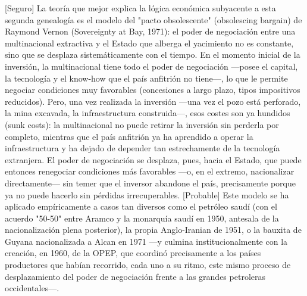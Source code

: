 \documentclass[10pt,a4paper]{article}
\begin{document}
[Seguro] La teoría que mejor explica la lógica económica subyacente a esta segunda genealogía es el modelo del "pacto obsolescente" (obsolescing bargain) de Raymond Vernon (Sovereignty at Bay, 1971): el poder de negociación entre una multinacional extractiva y el Estado que alberga el yacimiento no es constante, sino que se desplaza sistemáticamente con el tiempo. En el momento inicial de la inversión, la multinacional tiene todo el poder de negociación —posee el capital, la tecnología y el know-how que el país anfitrión no tiene—, lo que le permite negociar condiciones muy favorables (concesiones a largo plazo, tipos impositivos reducidos). Pero, una vez realizada la inversión —una vez el pozo está perforado, la mina excavada, la infraestructura construida—, esos costes son ya hundidos (sunk costs): la multinacional no puede retirar la inversión sin perderla por completo, mientras que el país anfitrión ya ha aprendido a operar la infraestructura y ha dejado de depender tan estrechamente de la tecnología extranjera. El poder de negociación se desplaza, pues, hacia el Estado, que puede entonces renegociar condiciones más favorables —o, en el extremo, nacionalizar directamente— sin temer que el inversor abandone el país, precisamente porque ya no puede hacerlo sin pérdidas irrecuperables. [Probable] Este modelo se ha aplicado empíricamente a casos tan diversos como el petróleo saudí (con el acuerdo "50-50" entre Aramco y la monarquía saudí en 1950, antesala de la nacionalización plena posterior), la propia Anglo-Iranian de 1951, o la bauxita de Guyana nacionalizada a Alcan en 1971 —y culmina institucionalmente con la creación, en 1960, de la OPEP, que coordinó precisamente a los países productores que habían recorrido, cada uno a su ritmo, este mismo proceso de desplazamiento del poder de negociación frente a las grandes petroleras occidentales—.
\end{document}
